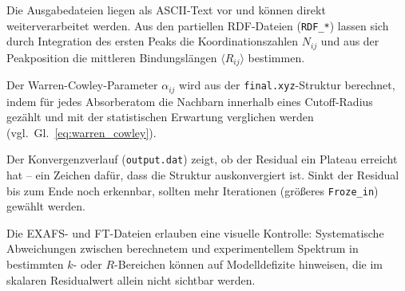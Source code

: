 Die Ausgabedateien liegen als ASCII-Text vor und können direkt
weiterverarbeitet werden.
Aus den partiellen RDF-Dateien (\texttt{RDF\_*}) lassen sich durch
Integration des ersten Peaks die Koordinationszahlen $N_{ij}$ und
aus der Peakposition die mittleren Bindungslängen
$\langle R_{ij} \rangle$ bestimmen.

Der Warren-Cowley-Parameter $\alpha_{ij}$ wird aus der
\texttt{final.xyz}-Struktur berechnet, indem für jedes Absorberatom
die Nachbarn innerhalb eines Cutoff-Radius gezählt und mit der
statistischen Erwartung verglichen werden
(vgl.\ Gl.~\eqref{eq:warren_cowley}).

Der Konvergenzverlauf (\texttt{output.dat}) zeigt, ob der
Residual ein Plateau erreicht hat -- ein Zeichen dafür, dass die
Struktur auskonvergiert ist.
Sinkt der Residual bis zum Ende noch erkennbar, sollten mehr
Iterationen (größeres \texttt{Froze\_in}) gewählt werden.

Die EXAFS- und FT-Dateien erlauben eine visuelle Kontrolle:
Systematische Abweichungen zwischen berechnetem und experimentellem
Spektrum in bestimmten $k$- oder $R$-Bereichen können auf
Modelldefizite hinweisen, die im skalaren Residualwert allein nicht
sichtbar werden.
